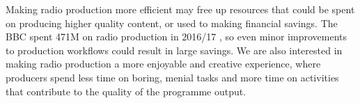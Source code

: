 




Making radio production more efficient may free up resources that could be spent on producing higher quality content,
or used to making financial savings. The BBC spent \textsterling471M on radio production in 2016/17 \citep[p.
111]{Ofcom2017}, so even minor improvements to production workflows could result in large savings.  We are also interested
in making radio production a more enjoyable and creative experience, where producers spend less time on boring, menial
tasks and more time on activities that contribute to the quality of the programme output.

